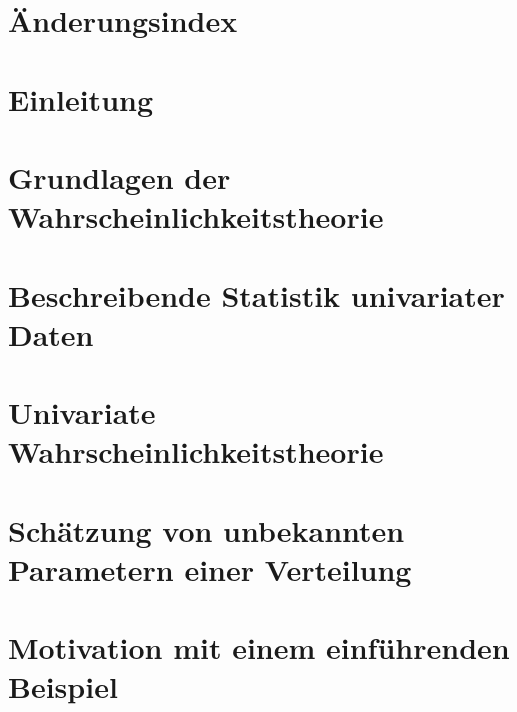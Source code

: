 

\thispagestyle{empty} %

\newpage

\thispagestyle{empty}
\section*{Änderungsindex}

\newpage
{}
\thispagestyle{empty}
\tableofcontents

\newpage

\thispagestyle{empty} %
\mbox{}


\section{Einleitung}


\clearpage

\section{Grundlagen der Wahrscheinlichkeitstheorie}\label{two}


\clearpage

\section{Beschreibende Statistik univariater Daten}\label{three}


\clearpage

\section{Univariate Wahrscheinlichkeitstheorie}\label{four}


\clearpage

\section{Sch\"{a}tzung von unbekannten Parametern einer Verteilung}\label{five}


\clearpage

\section{Motivation mit einem einführenden Beispiel}\label{six}


